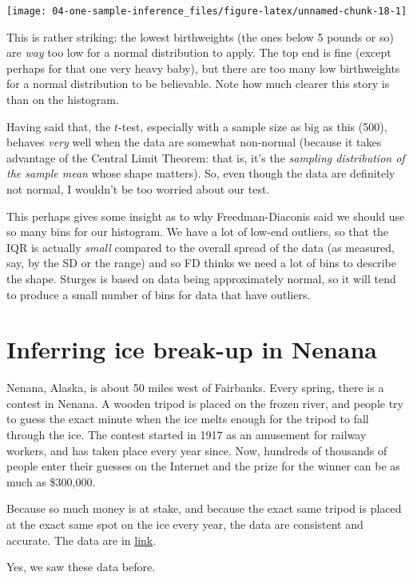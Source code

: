 \documentclass[]{tufte-book}
\theoremstyle{definition}
\theoremstyle{definition}
\theoremstyle{definition}
\theoremstyle{remark}
\begin{document}
\texttt{[image: 04-one-sample-inference\_files/figure-latex/unnamed-chunk-18-1]}

This is rather striking: the lowest birthweights (the ones below 5
pounds or so) are \emph{way} too low for a normal distribution to apply.
The top end is fine (except perhaps for that one very heavy baby), but
there are too many low birthweights for a normal distribution to be
believable. Note how much clearer this story is than on the histogram.

Having said that, the \(t\)-test, especially with a sample size as big
as this (500), behaves \emph{very} well when the data are somewhat
non-normal (because it takes advantage of the Central Limit Theorem:
that is, it's the \emph{sampling distribution of the sample mean} whose
shape matters). So, even though the data are definitely not normal, I
wouldn't be too worried about our test.

This perhaps gives some insight as to why Freedman-Diaconis said we
should use so many bins for our histogram. We have a lot of low-end
outliers, so that the IQR is actually \emph{small} compared to the
overall spread of the data (as measured, say, by the SD or the range)
and so FD thinks we need a lot of bins to describe the shape. Sturges is
based on data being approximately normal, so it will tend to produce a
small number of bins for data that have outliers.

\hypertarget{inferring-ice-break-up-in-nenana}{%
\section{Inferring ice break-up in
Nenana}\label{inferring-ice-break-up-in-nenana}}

Nenana, Alaska, is about 50 miles west of Fairbanks. Every spring, there
is a contest in Nenana. A wooden tripod is placed on the frozen river,
and people try to guess the exact minute when the ice melts enough for
the tripod to fall through the ice. The contest started in 1917 as an
amusement for railway workers, and has taken place every year since.
Now, hundreds of thousands of people enter their guesses on the Internet
and the prize for the winner can be as much as \$300,000.

Because so much money is at stake, and because the exact same tripod is
placed at the exact same spot on the ice every year, the data are
consistent and accurate. The data are in
\href{http://www.utsc.utoronto.ca/~butler/c32/nenana.txt}{link}.

Yes, we saw these data before.
\end{document}

